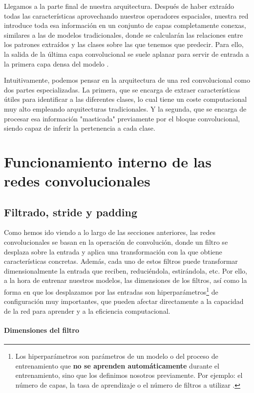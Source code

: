 Llegamos a la parte final de nuestra arquitectura. Después de haber extraído todas las características aprovechando nuestros operadores espaciales, nuestra red introduce toda esa información en un conjunto de capas completamente conexas, similares a las de modelos tradicionales, donde se calcularán las relaciones entre los patrones extraídos y las clases sobre las que tenemos que predecir. Para ello, la salida de la última capa convolucional se suele aplanar para servir de entrada a la primera capa densa del modelo \cite{nn_dl__michael_nielsen_2015}.

Intuitivamente, podemos pensar en la arquitectura de una red convolucional como dos partes especializadas. La primera, que se encarga de extraer características útiles para identificar a las diferentes clases, lo cual tiene un coste computacional muy alto empleando arquitecturas tradicionales. Y la segunda, que se encarga de procesar esa información "masticada" previamente por el bloque convolucional, siendo capaz de inferir la pertenencia a cada clase.

\section{Funcionamiento interno de las redes convolucionales}
\label{sec:funcionamiento_interno_cnn}
\subsection{Filtrado, stride y padding}
Como hemos ido viendo a lo largo de las secciones anteriores, las redes convolucionales se basan en la operación de convolución, donde un filtro se desplaza sobre la entrada y aplica una transformación con la que obtiene características concretas. Además, cada uno de estos filtros puede transformar dimensionalmente la entrada que reciben, reduciéndola, estirándola, etc. Por ello, a la hora de entrenar nuestros modelos, las dimensiones de los filtros, así como la forma en que los desplazamos por las entradas son hiperparámetros\footnote{Los hiperparámetros son parámetros de un modelo o del proceso de entrenamiento que \textbf{no se aprenden automáticamente} durante el entrenamiento, sino que los definimos nosotros previamente. Por ejemplo: el número de capas, la tasa de aprendizaje o el número de filtros a utilizar \cite{dl__goodfellow_2016}.} de configuración muy importantes, que pueden afectar directamente a la capacidad de la red para aprender y a la eficiencia computacional.

\paragraph{Dimensiones del filtro}

